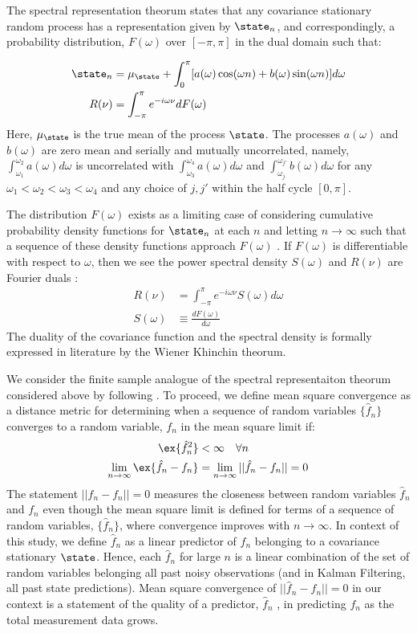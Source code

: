  The spectral representation theorum states that any covariance stationary random process has a representation given by $\state_n$, and correspondingly,  a probability distribution, $F(\omega)$ over $[-\pi, \pi]$ in the dual domain such that:
 
\begin{align}
\state_n & = \mu_\state + \int_{0}^{\pi} [ a(\omega) \cos(\omega n) +  b(\omega) \sin(\omega n) ] d\omega \\
R(\nu) & = \int_{-\pi}^{\pi} e^{-i\omega \nu } dF(\omega)
\end{align}
Here, $\mu_\state $ is the true mean of the process $\state$.  The processes $a(\omega) $ and $b(\omega)$ are zero mean and serially and mutually uncorrelated, namely, $\int_{\omega_1}^{\omega_{2}} a(\omega) d\omega$ is uncorrelated with $\int_{\omega_3}^{\omega_{4}} a(\omega) d\omega$ and $\int_{\omega_j}^{\omega_{j'}} b(\omega) d\omega$ for any $\omega_1 < \omega_2 < \omega_3 < \omega_4$ and any choice of $j, j'$ within the half cycle  $[0, \pi]$.

The distribution $F(\omega)$ exists as a limiting case of considering cumulative probability density functions for $\state_n$ at each $n$ and letting $n \to \infty$ such that a sequence of these density functions approach $F(\omega)$ \cite{karlin1975first}.  If $F(\omega)$ is differentiable with respect to $\omega$, then we see the power spectral density $S(\omega)$ and $R(\nu)$ are Fourier duals \cite{karlin1975first}:
\begin{align}
R(\nu) & = \int_{-\pi}^{\pi} e^{-i\omega \nu } S(\omega)d\omega \\
S(\omega) & \equiv \frac{dF(\omega)}{d\omega} 
\end{align}
The duality of the covariance function and the spectral density is formally expressed  in literature by the  Wiener Khinchin theorum.

We consider the finite sample analogue of the spectral representaiton theorum considered above by following \cite{hamilton1994time}. To proceed, we define mean square convergence as a distance metric for determining when a sequence of random variables $\{ \hat{f}_n\}$ converges to a random variable, $f_n$ in the mean square limit if:
\begin{align}
\ex{\hat{f}_n^2} & < \infty \quad \forall n \\
\lim_{n \to \infty}\ex{\hat{f}_n - f_n} & = \lim_{n \to \infty} ||\hat{f}_n- f_n || = 0
\end{align} 
The statement $||\hat{f}_n- f_n || = 0$ measures the closeness between random variables $\hat{f}_n$ and $f_n$ even though the mean square limit is defined for terms of a sequence of random variables, $\{ \hat{f}_n\}$, where convergence improves with $n \to \infty$. In context of this study, we define $\hat{f}_n$ as a linear predictor of $f_n$ belonging to a covariance stationary $\state$. Hence, each $\hat{f}_n$ for large $n$ is a linear combination of the set of random variables belonging all past noisy observations (and in Kalman Filtering,  all past state predictions). Mean square convergence of $||\hat{f}_n- f_n || = 0$ in our context is a statement of the quality of a predictor, $\hat{f}_n$ , in predicting $f_n$ as the total measurement data grows.

